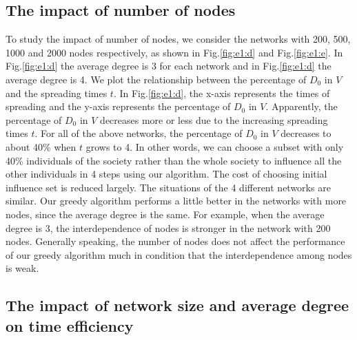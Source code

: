 \subsection{The impact of number of nodes}
To study the impact of number of nodes, we consider the networks with 200, 500, 1000 and 2000 nodes respectively, as shown in Fig.\ref{fig:e1:d} and Fig.\ref{fig:e1:e}. In Fig.\ref{fig:e1:d} the average degree is 3 for each network and in Fig.\ref{fig:e1:d} the average degree is 4. We plot the relationship between the percentage of $D_0$ in $V$ and the spreading times $t$. In Fig.\ref{fig:e1:d}, the x-axis represents the times of spreading and the y-axis represents the percentage of $D_0$ in $V$. Apparently, the percentage of $D_0$ in $V$ decreases more or less due to the increasing spreading times $t$. For all of the above networks, the percentage of $D_0$ in $V$ decreases to about 40\% when $t$ grows to 4. In other words, we can choose a subset with only 40\% individuals of the society rather than the whole society to influence all the other individuals in 4 steps using our algorithm. The cost of choosing initial influence set is reduced largely. The situations of the 4 different networks are similar. Our greedy algorithm performs a little better in the networks with more nodes, since the average degree is the same. For example, when the average degree is 3, the interdependence of nodes is stronger in the network with 200 nodes. Generally speaking, the number of nodes does not affect the performance of our greedy algorithm much in condition that the interdependence among nodes is weak.
\subsection{The impact of network size and average degree on time efficiency}

